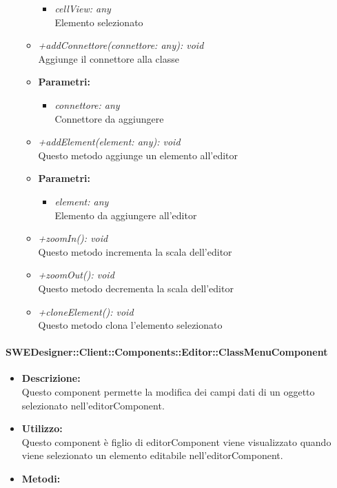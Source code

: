 \begin{itemize}
\begin{itemize}
            				\begin{itemize}
            					\item \emph{cellView: any}\\
            					Elemento selezionato
            				\end{itemize}
            			\item \emph{+addConnettore(connettore: any): void}\\
            			Aggiunge il connettore alla classe
            			\item \textbf{Parametri:}\\
            				\begin{itemize}
            					\item \emph{connettore: any}\\
            					Connettore da aggiungere
            				\end{itemize} 
            			\item \emph{+addElement(element: any): void}\\
            			Questo metodo aggiunge un elemento all'editor
            			\item \textbf{Parametri:}\\
            				\begin{itemize}
            					\item \emph{element: any}\\
            					Elemento da aggiungere all'editor
            				\end{itemize}   
            			\item \emph{+zoomIn(): void}\\
            			Questo metodo incrementa la scala dell'editor
            			\item \emph{+zoomOut(): void}\\
            			Questo metodo decrementa la scala dell'editor   	
            			\item \emph{+cloneElement(): void}\\
            			Questo metodo clona l'elemento selezionato			
          			\end{itemize}
          		\end{itemize}
          	\paragraph{SWEDesigner::Client::Components::Editor::ClassMenuComponent}
				\begin{itemize}
          			\item \textbf{Descrizione:}\\
          			Questo component permette la modifica dei campi dati di un oggetto selezionato nell’editorComponent.
          			\item \textbf{Utilizzo:}\\
          			Questo component è figlio di editorComponent viene visualizzato quando viene selezionato un elemento editabile nell’editorComponent.
          			\item \textbf{Metodi:}\\
          		\end{itemize}

